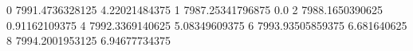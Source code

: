 0 7991.4736328125 4.22021484375
1 7987.25341796875 0.0
2 7988.1650390625 0.91162109375
4 7992.3369140625 5.08349609375
6 7993.93505859375 6.681640625
8 7994.2001953125 6.94677734375
